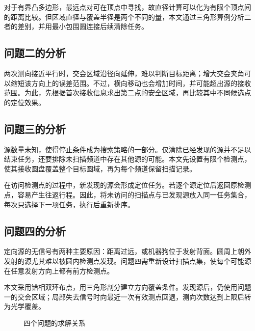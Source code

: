 \documentclass[UTF8,fontset=fandol,a4paper,zihao=-4]{ctexart}
\begin{document}
对于有界凸多边形，最远点对可在顶点中寻找，故直径计算可以化为有限个顶点间的距离比较。但区域直径与覆盖半径是两个不同的量，本文通过三角形算例分析二者的差别，并用最小包围圆连接后续清除任务。

\subsection{问题二的分析}
两次测向接近平行时，交会区域沿径向延伸，难以判断目标距离；增大交会夹角可以缩短该方向上的误差范围。不过，横向移动也会增加时间，并可能超出源的接收范围。为此，先根据首次接收信息求出第二点的安全区域，再比较其中不同候选点的定位效果。

\subsection{问题三的分析}
源数量未知，使得停止条件成为搜索策略的一部分。仅清除已经发现的源并不足以结束任务，还要排除未扫描频道中存在其他源的可能。本文先设置有限个检测点，使其接收圆盘覆盖整个目标圆域，再为每个频道保留扫描记录。

在访问检测点的过程中，新发现的源会形成定位任务。若逐个源定位后返回原检测点，容易产生往返行程。因此，将未访问的扫描点与已发现源放入同一任务集合，每次只选择下一项任务，执行后重新排序。

\subsection{问题四的分析}
定向源的无信号有两种主要原因：距离过远，或机器狗位于发射背面。圆周上朝外发射的源尤其难以被圆内检测点发现。问题四需重新设计扫描点集，使每个可能源在任意发射方向上都有前方检测点。

本文采用错相双环布点，用三角形剖分建立方向覆盖条件。发现源后，仍使用问题一的交会区域；局部失去信号时向最近一次有效测点回退，测向次数达到上限后转为光学覆盖。

\begin{figure}[htbp]\centering
{}
\caption{四个问题的求解关系}
\label{fig:body-structure}
\end{figure}
\end{document}
